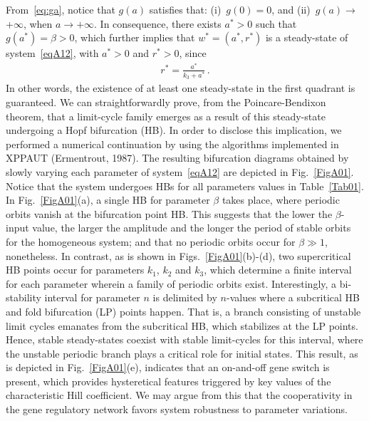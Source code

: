\documentclass[%
 preprint,
 amsmath,amssymb,
 aps,
]{revtex4-2}
\begin{document}
	{From~\eqref{eq:ga}, notice that $g(a)$ satisfies that: (i)~$g(0) = 0$, and (ii)~$g(a)\rightarrow$ +$\infty$, when  $a\rightarrow +\infty$. In consequence, there exists $a^*>0$ such that $g(a^*) = \beta> 0 $, which further implies that $w^*=(a^*, r^*)$ is a steady-state of system~\eqref{eqA12}, with $a^* >0$ and $r^*>0$, since }
	\begin{gather*}
	r^* = \frac{a^*}{k_3+a^*}\,.
	\end{gather*}
	In other words, the existence of at least one steady-state in the first quadrant is guaranteed. We can straightforwardly  prove, from the Poincare-Bendixon theorem, that a limit-cycle family emerges as a result of this steady-state undergoing a Hopf bifurcation (HB). In order to disclose this implication, we performed a numerical continuation by using the algorithms implemented in XPPAUT (Ermentrout, 1987). The resulting bifurcation diagrams obtained by slowly varying each parameter of system~\eqref{eqA12} are depicted in Fig.~\ref{FigA01}. Notice that the system undergoes HBs for all parameters values in Table~\ref{Tab01}. In Fig.~\ref{FigA01}(a), a single HB for parameter $\beta$ takes place, where periodic orbits vanish at the bifurcation point HB. This suggests that the lower the $\beta$-input value, the larger the amplitude and the longer the period of stable orbits for the homogeneous system; and that no periodic orbits occur for $\beta\gg1$, nonetheless. In contrast, as is shown in Figs.~\ref{FigA01}(b)-(d), two supercritical HB points occur for parameters $k_1$, $k_2$ and $k_3$, which determine a finite interval for each parameter wherein a family of periodic orbits exist. Interestingly, a bi-stability interval for parameter $n$ is delimited by $n$-values where a subcritical HB and fold bifurcation (LP) points happen. That is, a branch consisting of unstable limit cycles emanates from the subcritical HB, which stabilizes at the LP points. Hence, stable steady-states coexist with stable limit-cycles for this interval, where the unstable periodic branch plays a critical role for initial states. This result, as is depicted in Fig.~\ref{FigA01}(e), indicates that an on-and-off gene switch is present, which provides hysteretical features triggered by key values of the characteristic Hill coefficient. We may argue from this that the cooperativity in the gene regulatory network favors system robustness to parameter variations.
	
\end{document}
